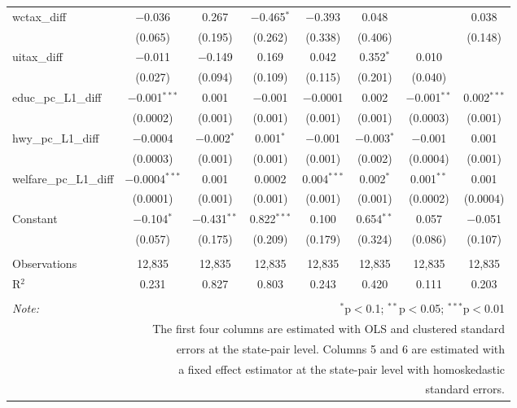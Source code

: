 \begin{table}[!htbp]
\begin{tabular}{@{\extracolsep{5pt}}lccccccc}
  wctax\_diff & $-$0.036 & 0.267 & $-$0.465$^{*}$ & $-$0.393 & 0.048 &  & 0.038 \\ 
  & (0.065) & (0.195) & (0.262) & (0.338) & (0.406) &  & (0.148) \\ 
  uitax\_diff & $-$0.011 & $-$0.149 & 0.169 & 0.042 & 0.352$^{*}$ & 0.010 &  \\ 
  & (0.027) & (0.094) & (0.109) & (0.115) & (0.201) & (0.040) &  \\ 
  educ\_pc\_L1\_diff & $-$0.001$^{***}$ & 0.001 & $-$0.001 & $-$0.0001 & 0.002 & $-$0.001$^{**}$ & 0.002$^{***}$ \\ 
  & (0.0002) & (0.001) & (0.001) & (0.001) & (0.001) & (0.0003) & (0.001) \\ 
  hwy\_pc\_L1\_diff & $-$0.0004 & $-$0.002$^{*}$ & 0.001$^{*}$ & $-$0.001 & $-$0.003$^{*}$ & $-$0.001 & 0.001 \\ 
  & (0.0003) & (0.001) & (0.001) & (0.001) & (0.002) & (0.0004) & (0.001) \\ 
  welfare\_pc\_L1\_diff & $-$0.0004$^{***}$ & 0.001 & 0.0002 & 0.004$^{***}$ & 0.002$^{*}$ & 0.001$^{**}$ & 0.001 \\ 
  & (0.0001) & (0.001) & (0.001) & (0.001) & (0.001) & (0.0002) & (0.0004) \\ 
  Constant & $-$0.104$^{*}$ & $-$0.431$^{**}$ & 0.822$^{***}$ & 0.100 & 0.654$^{**}$ & 0.057 & $-$0.051 \\ 
  & (0.057) & (0.175) & (0.209) & (0.179) & (0.324) & (0.086) & (0.107) \\ 
 \hline \\[-1.8ex] 
Observations & 12,835 & 12,835 & 12,835 & 12,835 & 12,835 & 12,835 & 12,835 \\ 
R$^{2}$ & 0.231 & 0.827 & 0.803 & 0.243 & 0.420 & 0.111 & 0.203 \\ 
\hline 
\hline \\[-1.8ex] 
\textit{Note:}  & \multicolumn{7}{r}{$^{*}$p$<$0.1; $^{**}$p$<$0.05; $^{***}$p$<$0.01} \\ 
 & \multicolumn{7}{r}{The first four columns are estimated with OLS and clustered standard} \\ 
 & \multicolumn{7}{r}{ errors at the state-pair level. Columns 5 and 6 are estimated with} \\ 
 & \multicolumn{7}{r}{a fixed effect estimator at the state-pair level with homoskedastic} \\ 
 & \multicolumn{7}{r}{standard errors.} \\ 
\end{tabular} 
\end{table} 
